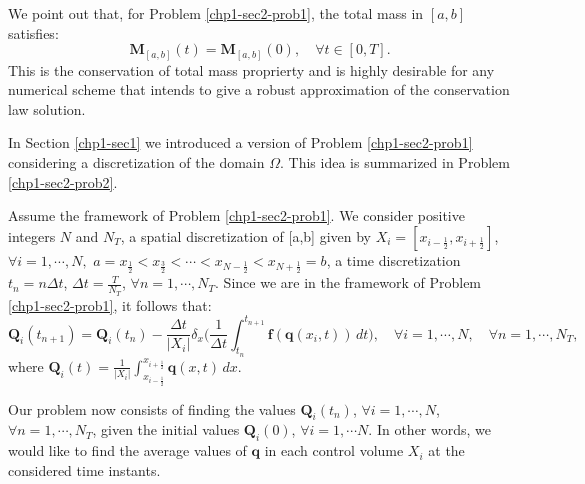 We point out that, for Problem \ref{chp1-sec2-prob1}, 
the total mass in $[a,b]$ satisfies: 
\begin{equation}
	\mathbf{M}_{[a,b]}(t) = \mathbf{M}_{[a,b]}(0), \quad \forall t \in [0,T].
\end{equation}
This is the conservation of total mass proprierty and is highly desirable
for any numerical scheme that intends to give a robust approximation of the 
conservation law solution.

In Section \ref{chp1-sec1} we introduced a version of Problem \ref{chp1-sec2-prob1}
considering a discretization of the domain $\Omega$. 
This idea is summarized in Problem \ref{chp1-sec2-prob2}.
\begin{prob}
        \label{chp1-sec2-prob2}
	Assume the framework of Problem \ref{chp1-sec2-prob1}.
        We consider positive integers $N$ and $N_T$, a spatial discretization of [a,b] given by
        $X_i = [x_{i-\frac{1}{2}}, x_{i+\frac{1}{2}}]$,
        $\forall i = 1, \cdots, N,$ 
	$a = x_{\frac{1}{2}} < x_{\frac{3}{2}} < \cdots < x_{N-\frac{1}{2}} < x_{N+\frac{1}{2}} = b$,
        a time discretization
        $t_n = n\Delta t$, $\Delta t = \frac{T}{N_T}$, $\forall n = 1, \cdots, N_T$.
	Since we are in the framework of Problem \ref{chp1-sec2-prob1}, it follows that:
        \begin{equation*}
                \mathbf{Q}_i(t_{n+1}) =  \mathbf{Q}_i(t_n) -
                \frac{\Delta t}{|X_i|} \delta _x\bigg( \frac{1}{\Delta t}\int_{t_n}^{t_{n+1}}
                \mathbf{f}(\mathbf{q}(x_{i}, t)) \,dt \bigg),
                \quad \forall i = 1, \cdots, N,
                \quad \forall n = 1, \cdots, N_T,
        \end{equation*}
        where $\mathbf{Q}_i(t) = \frac{1}{|X_i|}
        \int_{x_{i-\frac{1}{2}}}^{x_{i+\frac{1}{2}}} \mathbf{q}(x,t) \,dx$.
	
	Our problem now consists of finding the values $\mathbf{Q}_i(t_{n})$, 
	$\forall i = 1, \cdots, N$, $\forall n = 1, \cdots, N_T$,
	given the initial values $\mathbf{Q}_i(0)$, $\forall i = 1, \cdots N$.
	In other words, we would like to find the average values of $\mathbf{q}$
	in each control volume $X_i$ at the considered time instants.
\end{prob}

